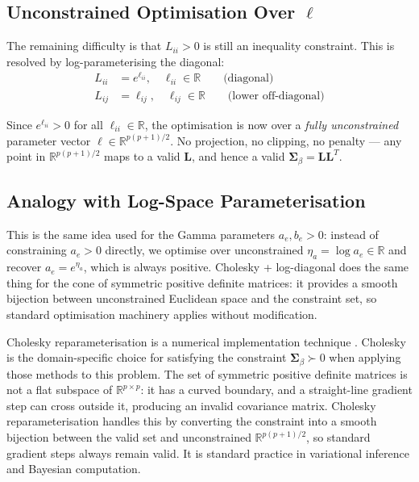 \documentclass[11pt,a4paper]{article}
\newcommand{\R}{\mathbb{R}}
\begin{document}
\subsection*{Unconstrained Optimisation Over $\bm{\ell}$}

The remaining difficulty is that $L_{ii} > 0$ is still an inequality constraint. This is resolved by log-parameterising the diagonal:
\begin{align}
  L_{ii} &= e^{\ell_{ii}}, \quad \ell_{ii} \in \R \qquad \text{(diagonal)}\\
  L_{ij} &= \ell_{ij}, \quad \ell_{ij} \in \R \qquad \text{(lower off-diagonal)}
\end{align}

Since $e^{\ell_{ii}} > 0$ for all $\ell_{ii} \in \R$, the optimisation is now over a \emph{fully unconstrained} parameter vector $\bm{\ell} \in \R^{p(p+1)/2}$. No projection, no clipping, no penalty --- any point in $\R^{p(p+1)/2}$ maps to a valid $\bm{L}$, and hence a valid $\bm{\Sigma}_\beta = \bm{L}\bm{L}^T$.

\subsection*{Analogy with Log-Space Parameterisation}

This is the same idea used for the Gamma parameters $a_e, b_e > 0$: instead of constraining $a_e > 0$ directly, we optimise over unconstrained $\eta_a = \log a_e \in \R$ and recover $a_e = e^{\eta_a}$, which is always positive. Cholesky + log-diagonal does the same thing for the cone of symmetric positive definite matrices: it provides a smooth bijection between unconstrained Euclidean space and the constraint set, so standard optimisation machinery applies without modification.

 

Cholesky reparameterisation is a numerical implementation technique .   Cholesky is the domain-specific choice for satisfying the constraint $\bm{\Sigma}_\beta \succ 0$ when applying those methods to this problem. The set of symmetric positive definite matrices is not a flat subspace of $\R^{p \times p}$: it has a curved boundary, and a straight-line gradient step can cross outside it, producing an invalid covariance matrix. Cholesky reparameterisation handles this by converting the constraint into a smooth bijection between the valid set and unconstrained $\R^{p(p+1)/2}$, so standard gradient steps always remain valid. It is standard practice in variational inference and Bayesian computation.
\end{document}
